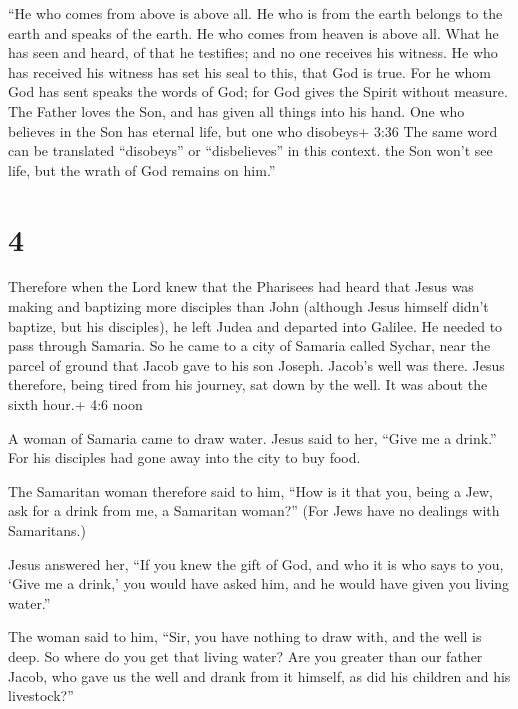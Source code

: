  ``He who comes from above is above all. He who is from the
earth belongs to the earth and speaks of the earth. He who comes from
heaven is above all.  What he has seen and heard, of that
he testifies; and no one receives his witness.  He who has
received his witness has set his seal to this, that God is true.
 For he whom God has sent speaks the words of God; for God
gives the Spirit without measure.  The Father loves the
Son, and has given all things into his hand.  One who
believes in the Son has eternal life, but one who disobeys+ 3:36 The
same word can be translated ``disobeys'' or ``disbelieves'' in this
context. the Son won't see life, but the wrath of God remains on him.''

\hypertarget{section-3}{%
\section{4}\label{section-3}}

 Therefore when the Lord knew that the Pharisees had heard
that Jesus was making and baptizing more disciples than John
 (although Jesus himself didn't baptize, but his disciples),
 he left Judea and departed into Galilee.  He
needed to pass through Samaria.  So he came to a city of
Samaria called Sychar, near the parcel of ground that Jacob gave to his
son Joseph.  Jacob's well was there. Jesus therefore, being
tired from his journey, sat down by the well. It was about the sixth
hour.+ 4:6 noon

 A woman of Samaria came to draw water. Jesus said to her,
``Give me a drink.''  For his disciples had gone away into
the city to buy food.

 The Samaritan woman therefore said to him, ``How is it that
you, being a Jew, ask for a drink from me, a Samaritan woman?'' (For
Jews have no dealings with Samaritans.)

 Jesus answered her, ``If you knew the gift of God, and who
it is who says to you, `Give me a drink,' you would have asked him, and
he would have given you living water.''

 The woman said to him, ``Sir, you have nothing to draw
with, and the well is deep. So where do you get that living water?
 Are you greater than our father Jacob, who gave us the
well and drank from it himself, as did his children and his livestock?''

